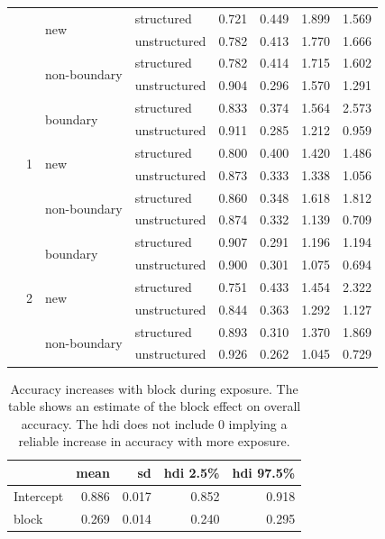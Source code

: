 \begin{table}
\begin{tabular}{llllrrrr}
        \cline{3-8}
         &  & \multirow[t]{2}{*}{new} & structured & 0.721 & 0.449 & 1.899 & 1.569 \\
         &  &  & unstructured & 0.782 & 0.413 & 1.770 & 1.666 \\
        \cline{3-8}
         &  & \multirow[t]{2}{*}{non-boundary} & structured & 0.782 & 0.414 & 1.715 & 1.602 \\
         &  &  & unstructured & 0.904 & 0.296 & 1.570 & 1.291 \\
        \cline{2-8} \cline{3-8}
         & \multirow[t]{6}{*}{1} & \multirow[t]{2}{*}{boundary} & structured & 0.833 & 0.374 & 1.564 & 2.573 \\
         &  &  & unstructured & 0.911 & 0.285 & 1.212 & 0.959 \\
        \cline{3-8}
         &  & \multirow[t]{2}{*}{new} & structured & 0.800 & 0.400 & 1.420 & 1.486 \\
         &  &  & unstructured & 0.873 & 0.333 & 1.338 & 1.056 \\
        \cline{3-8}
         &  & \multirow[t]{2}{*}{non-boundary} & structured & 0.860 & 0.348 & 1.618 & 1.812 \\
         &  &  & unstructured & 0.874 & 0.332 & 1.139 & 0.709 \\
        \cline{2-8} \cline{3-8}
         & \multirow[t]{6}{*}{2} & \multirow[t]{2}{*}{boundary} & structured & 0.907 & 0.291 & 1.196 & 1.194 \\
         &  &  & unstructured & 0.900 & 0.301 & 1.075 & 0.694 \\
        \cline{3-8}
         &  & \multirow[t]{2}{*}{new} & structured & 0.751 & 0.433 & 1.454 & 2.322 \\
         &  &  & unstructured & 0.844 & 0.363 & 1.292 & 1.127 \\
        \cline{3-8}
         &  & \multirow[t]{2}{*}{non-boundary} & structured & 0.893 & 0.310 & 1.370 & 1.869 \\
         &  &  & unstructured & 0.926 & 0.262 & 1.045 & 0.729 \\
        \cline{1-8} \cline{2-8} \cline{3-8}
        \bottomrule
        \end{tabular}
    \end{table}

\begin{table}
    \caption{Accuracy increases with block during exposure. The table shows an estimate of the block effect on overall accuracy. The hdi does not include 0 implying a reliable increase in accuracy with more exposure.}
    \label{tab:acc-block-hdi}
    \begin{tabular}{lrrrr}
        \toprule
         & mean & sd & hdi 2.5\% & hdi 97.5\% \\
        \midrule
        Intercept & 0.886 & 0.017 & 0.852 & 0.918 \\
        block & 0.269 & 0.014 & 0.240 & 0.295 \\
        \bottomrule
    \end{tabular}        
\end{table}

